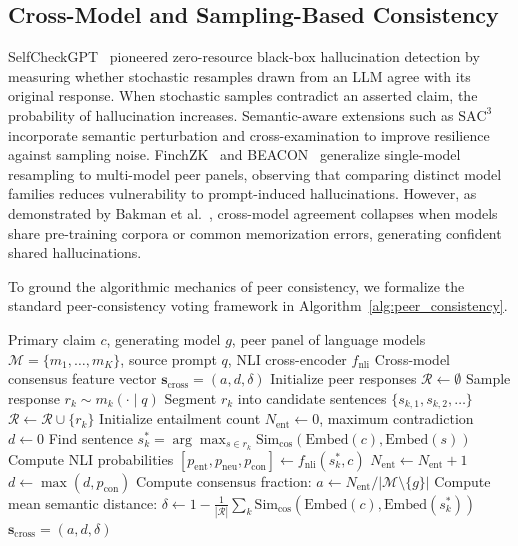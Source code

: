 \documentclass[pdflatex,sn-mathphys,Numbered]{sn-jnl}
\begin{document}
\subsection{Cross-Model and Sampling-Based Consistency}
SelfCheckGPT~\cite{manakul2023selfcheckgpt} pioneered zero-resource black-box hallucination detection by measuring whether stochastic resamples drawn from an LLM agree with its original response. When stochastic samples contradict an asserted claim, the probability of hallucination increases. Semantic-aware extensions such as $\mathrm{SAC}^3$~\cite{zhang2023sac3} incorporate semantic perturbation and cross-examination to improve resilience against sampling noise. FinchZK~\cite{goel2025finchzk} and BEACON~\cite{chen2024beacon} generalize single-model resampling to multi-model peer panels, observing that comparing distinct model families reduces vulnerability to prompt-induced hallucinations. However, as demonstrated by Bakman et al.~\cite{bakman2025wild}, cross-model agreement collapses when models share pre-training corpora or common memorization errors, generating confident shared hallucinations.

To ground the algorithmic mechanics of peer consistency, we formalize the standard peer-consistency voting framework in Algorithm~\ref{alg:peer_consistency}.

\begin{algorithm}[htbp]
\caption{Cross-Model Peer Consistency Verification}\label{alg:peer_consistency}
\begin{algorithmic}[1]
\Require Primary claim $c$, generating model $g$, peer panel of language models $\mathcal{M} = \{m_1, \dots, m_K\}$, source prompt $q$, NLI cross-encoder $f_{\mathrm{nli}}$
\Ensure Cross-model consensus feature vector $\mathbf{s}_{\mathrm{cross}} = (a, d, \delta)$
\State Initialize peer responses $\mathcal{R} \leftarrow \emptyset$
    \State Sample response $r_k \sim m_k(\cdot \mid q)$
    \State Segment $r_k$ into candidate sentences $\{s_{k,1}, s_{k,2}, \dots\}$
    \State $\mathcal{R} \leftarrow \mathcal{R} \cup \{r_k\}$
\EndFor
\State Initialize entailment count $N_{\mathrm{ent}} \leftarrow 0$, maximum contradiction $d \leftarrow 0$
    \State Find sentence $s_{k}^* = \arg\max_{s \in r_k} \mathrm{Sim}_{\mathrm{cos}}(\mathrm{Embed}(c), \mathrm{Embed}(s))$
    \State Compute NLI probabilities $[p_{\mathrm{ent}}, p_{\mathrm{neu}}, p_{\mathrm{con}}] \leftarrow f_{\mathrm{nli}}(s_{k}^*, c)$
        \State $N_{\mathrm{ent}} \leftarrow N_{\mathrm{ent}} + 1$
    \EndIf
    \State $d \leftarrow \max(d, p_{\mathrm{con}})$
\EndFor
\State Compute consensus fraction: $a \leftarrow N_{\mathrm{ent}} / |\mathcal{M} \setminus \{g\}|$
\State Compute mean semantic distance: $\delta \leftarrow 1 - \frac{1}{|\mathcal{R}|} \sum_{k} \mathrm{Sim}_{\mathrm{cos}}(\mathrm{Embed}(c), \mathrm{Embed}(s_k^*))$
\State \Return $\mathbf{s}_{\mathrm{cross}} = (a, d, \delta)$
\end{algorithmic}
\end{algorithm}
\end{document}
